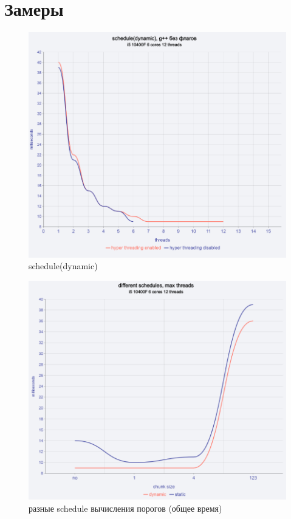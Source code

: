 \documentclass{article}
\begin{document}
\section{Замеры}
  \begin{figure}[H]
	\includegraphics[width=1\textwidth]{pictures/Screenshot_1.png}
	\caption{schedule(dynamic)}
  \end{figure}
  \begin{figure}[H]
	\includegraphics[width=1\textwidth]{pictures/Screenshot_2.png}
	\caption{разные schedule вычисления порогов (общее время)}
  \end{figure}
\end{document}
